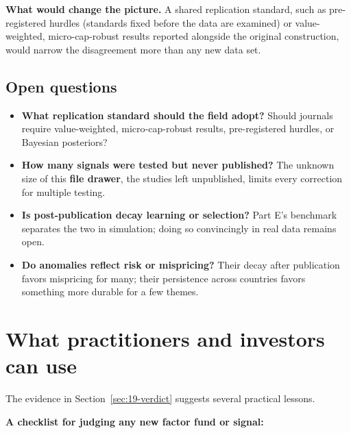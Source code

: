 \textbf{What would change the picture.} A shared replication standard, such as pre-registered hurdles (standards fixed before the data are examined) or value-weighted, micro-cap-robust results reported alongside the original construction, would narrow the disagreement more than any new data set.

\subsection{Open questions}
\label{sec:19-open}

\begin{itemize}
  \item \textbf{What replication standard should the field adopt?} Should journals require value-weighted, micro-cap-robust results, pre-registered hurdles, or Bayesian posteriors?
  \item \textbf{How many signals were tested but never published?} The unknown size of this \textbf{file drawer}, the studies left unpublished, limits every correction for multiple testing.
  \item \textbf{Is post-publication decay learning or selection?} Part E's benchmark separates the two in simulation; doing so convincingly in real data remains open.
  \item \textbf{Do anomalies reflect risk or mispricing?} Their decay after publication favors mispricing for many; their persistence across countries favors something more durable for a few themes.
\end{itemize}

\section{What practitioners and investors can use}
\label{sec:19-investors}

The evidence in Section~\ref{sec:19-verdict} suggests several practical lessons.

\textbf{A checklist for judging any new factor fund or signal:}

